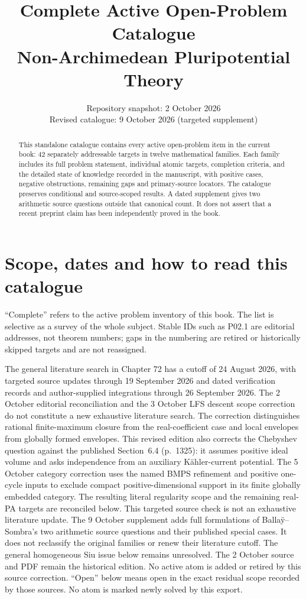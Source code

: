 \documentclass[11pt,a4paper]{article}
\title{Complete Active Open-Problem Catalogue\\[.5em]\large Non-Archimedean Pluripotential Theory}
\author{}
\date{Repository snapshot: 2 October 2026\\Revised catalogue: 9 October 2026 (targeted supplement)}
\theoremstyle{definition}
\theoremstyle{remark}
\begin{document}
\maketitle
\begin{abstract}
This standalone catalogue contains every active open-problem item in the
current book: 42 separately addressable targets in twelve mathematical
families. Each family includes its full problem statement, individual
atomic targets, completion criteria, and the detailed state of knowledge
recorded in the manuscript, with positive cases, negative obstructions,
remaining gaps and primary-source locators. The catalogue preserves
conditional and source-scoped results. A dated supplement gives two
arithmetic source questions outside that canonical count. It does not assert that a recent
preprint claim has been independently proved in the book.
\end{abstract}
\tableofcontents
\clearpage
\section*{Scope, dates and how to read this catalogue}
``Complete'' refers to the active problem inventory of this book. The list
is selective as a survey of the whole subject. Stable IDs such as P02.1
are editorial addresses, not theorem numbers; gaps in the numbering are
retired or historically skipped targets and are not reassigned.

The general literature search in Chapter 72 has a cutoff of 24 August
2026, with targeted source updates through 19 September 2026 and dated
verification records and author-supplied integrations through 26 September
2026. The 2 October editorial reconciliation and the 3 October LFS descent
scope correction do not constitute a new exhaustive literature search.
The correction distinguishes rational finite-maximum closure from the
real-coefficient case and local envelopes from globally formed envelopes.
This revised edition also corrects the Chebyshev question against the
published Section~6.4 (p.~1325): it assumes positive ideal volume and
asks independence from an auxiliary K\"ahler-current potential.
The 5 October category correction uses the named BMPS refinement and
positive one-cycle inputs to exclude compact positive-dimensional
support in its finite globally embedded category. The resulting literal
regularity scope and the remaining real-PA targets are reconciled below.
This targeted source check is not an exhaustive literature update.
The 9 October supplement adds full formulations of Balla\"y--Sombra's
two arithmetic source questions and their published special cases.
It does not reclassify the original families or renew their literature
cutoff. The general homogeneous Siu issue below remains unresolved.
The 2 October source and PDF remain the historical edition. No active
atom is added or retired by this source correction.
``Open'' below means open in the exact
residual scope recorded by those sources. No atom is marked newly solved
by this export.
\end{document}
